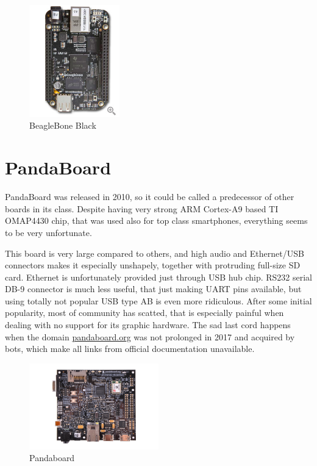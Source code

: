\documentclass[printmode]{mgr}
\begin{document}
\begin{figure}[htbp]
  \centering
    \includegraphics[width=0.35\textwidth,angle=-90,origin=c]{beaglebone-front.jpg}
  \caption{BeagleBone Black}
  \label{fig:devboard-beaglebone}
\end{figure}

\section{PandaBoard}

PandaBoard was released in 2010, so it could be called a predecessor of other boards in its class. Despite having very strong ARM Cortex-A9 based TI OMAP4430 chip, that was used also for top class smartphones, everything seems to be very unfortunate.

This board is very large compared to others, and high audio and Ethernet/USB connectors makes it especially unshapely, together with protruding full-size SD card. Ethernet is unfortunately provided just through USB hub chip. RS232 serial DB-9 connector is much less useful, that just making UART pins available, but using totally not popular USB type AB is even more ridiculous. After some initial popularity, most of community has scatted, that is especially painful when dealing with no support for its graphic hardware. The sad last cord happens when the domain \url{pandaboard.org} was not prolonged in 2017 and acquired by bots, which make all links from official documentation unavailable.

\begin{figure}[htbp]
  \centering
    \includegraphics[width=0.5\textwidth]{pandaboard-front.png}
  \caption{Pandaboard}
  \label{fig:devboard-pandaboard}
\end{figure}
\end{document}
